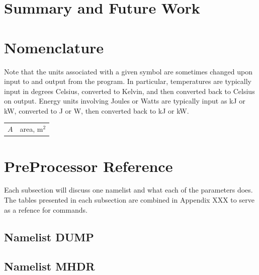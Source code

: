 \documentclass[12pt,twoside]{book}
\begin{document}
%
%

\chapter{Summary and Future Work}



\appendix
{}

%
%

\chapter{Nomenclature}
\label{nomenclature}

Note that the units associated with a given symbol are sometimes changed upon input to and output from the program. In particular, temperatures are typically input in degrees Celsius, converted to Kelvin, and then converted back to Celsius on output. Energy units involving Joules or Watts are typically input as kJ or kW, converted to J or W, then converted back to kJ or kW.

\begin{center}
\begin{longtable}{p{1in}  p{5.5 in}}

$A$                 & area, m$^2$ \\
\end{longtable}

\end{center}

\chapter{PreProcessor Reference}
\label{preprocessor_reference}
Each subsection will discuss one namelist and what each of the parameters does. The tables presented in each subsection are combined in Appendix XXX  to serve as a refence for commands.

\section{Namelist DUMP}

\section{Namelist MHDR}
\end{document}
